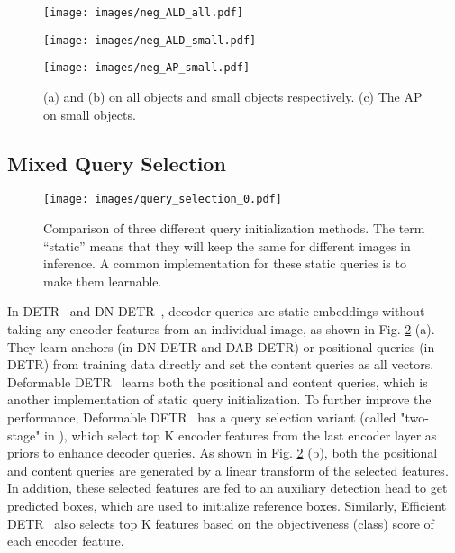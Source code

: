 \documentclass[runningheads]{llncs}
\begin{document}
\begin{figure}[htbp]
\vspace{-0.3cm}
\centering
\begin{minipage}[t]{0.3\textwidth}
\centering
\texttt{[image: images/neg\_ALD\_all.pdf]}
\end{minipage}
\hfill
\begin{minipage}[t]{0.3\textwidth}
\centering
\texttt{[image: images/neg\_ALD\_small.pdf]}
\end{minipage}
\hfill
\begin{minipage}[t]{0.3\textwidth}
\centering
\texttt{[image: images/neg\_AP\_small.pdf]}
\end{minipage}
\vspace{-0.3cm}
\caption{(a) and (b)  on all objects and small objects respectively. (c) The AP on small objects.}
\label{fig:neg_dist}
\vspace{-.1cm}
\end{figure} 
\subsection{Mixed Query Selection}
\label{sec:mixed_query_selection}

\begin{figure}[h]
\texttt{[image: images/query\_selection\_0.pdf]}
    \centering
\caption{Comparison of three different query initialization methods. The term ``static'' means that they will keep the same for different images in inference. A common implementation for these static queries is to make them learnable. }
    \label{fig:query_selection}
\end{figure} 
In DETR~\cite{carion2020end} and DN-DETR~\cite{li2022dn}, decoder queries are static embeddings without taking any encoder features from an individual image, as shown in Fig. \ref{fig:query_selection} (a). They learn anchors (in DN-DETR and DAB-DETR) or positional queries (in DETR) from training data directly and set the content queries as all  vectors. 
Deformable DETR~\cite{zhu2020deformable} learns both the positional and content queries, which is another implementation of static query initialization.
To further improve the performance, Deformable DETR~\cite{zhu2020deformable} has a query selection variant (called "two-stage" in \cite{zhu2020deformable}), which select top K encoder features from the last encoder layer as priors to enhance decoder queries. As shown in Fig. \ref{fig:query_selection} (b), both the positional and content queries are generated by a linear transform of the selected features.
In addition, these selected features are fed to an auxiliary detection head to get predicted boxes, which are used to initialize reference boxes. Similarly, Efficient DETR~\cite{yao2021efficient} also selects top K features based on the objectiveness (class) score of each encoder feature. 
\end{document}
